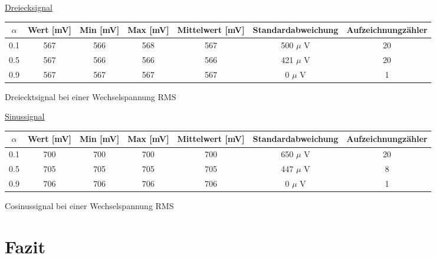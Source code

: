     \underline{Dreiecksignal}
        
            \hspace{-4em}           
                 \begin{tabular}{|c|c|c|c|c|c|c|}                 
                  \hline
                   $\alpha $ & Wert [mV] & Min [mV] & Max [mV] & Mittelwert [mV]
                   & Standardabweichung & Aufzeichnungzähler\\ \hline 
                   0.1 & 567 & 566 & 568 & 567 & 500 $\mu$ V & 20 \\ \hline
                   0.5 & 567 & 566 & 566 & 566 & 421 $\mu$ V & 20 \\ \hline
                   0.9 & 567 & 567 & 567 & 567 & 0 $\mu$ V & 1 \\ \hline
                 \end{tabular}
                       \caption{Dreiecktsignal bei einer Wechselspannung RMS}
                        \label{tablelabel2}
             
     
    \vspace{1.5em}
             
    \underline{Sinussignal}
        
            \hspace{-4em}                 
                 \begin{tabular}{|c|c|c|c|c|c|c|}
                  \hline
                   $\alpha $ & Wert [mV] & Min [mV] & Max [mV] & Mittelwert [mV]
                   & Standardabweichung & Aufzeichnungzähler\\ \hline 
                   0.1 & 700 & 700 & 700 & 700 & 650 $\mu$ V & 20 \\ \hline
                   0.5 & 705 & 705 & 705 & 705 & 447 $\mu$ V & 8 \\ \hline
                   0.9 & 706 & 706 & 706 & 706 & 0 $\mu$ V & 1 \\ \hline
                 \end{tabular}          
                       \caption{Cosinussignal bei einer Wechselspannung RMS}
                        \label{tablelabel3}
            
    


\section{Fazit}
\begin{quote}
     
\end{quote}

